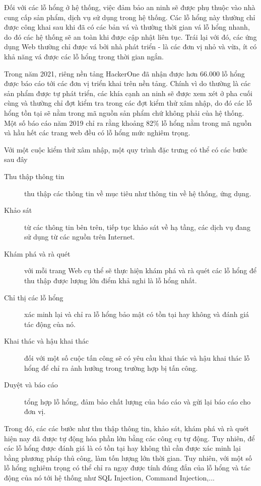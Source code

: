 \documentclass[./../main.tex]{subfiles}
\begin{document}
Đối với các lỗ hổng ở hệ thống, việc đảm bảo an ninh sẽ được phụ thuộc vào nhà cung cấp sản phẩm, dịch vụ sử dụng trong hệ thống.
Các lỗ hổng này thường chỉ được công khai sau khi đã có các bản vá và thường thời gian vá lỗ hổng nhanh, do đó các hệ thống sẽ an toàn khi được cập nhật liên tục. Trái lại với đó, các ứng dụng Web thường chỉ được vá bởi nhà phát triển - là các đơn vị nhỏ và vừa, ít có khả năng vá được các lỗ hổng trong thời gian ngắn.

Trong năm 2021, riêng nền tảng HackerOne đã nhận được hơn 66.000 lỗ hổng được báo cáo tới các đơn vị triển khai trên nền tảng.
Chính vì do thường là các sản phẩm được tự phát triển, các khía cạnh an ninh sẽ được xem xét ở pha cuối cùng và thường chỉ đợt kiểm tra trong các đợt kiểm thử xâm nhập, do đó các lỗ hổng tồn tại sẽ nằm trong mã nguồn sản phẩm chứ không phải của hệ thống. Một số báo cáo năm 2019 chỉ ra rằng khoảng 82\% lỗ hổng nằm trong mã nguồn và hầu hết các trang web đều có lỗ hổng mức nghiêm trọng.

Với một cuộc kiểm thử xâm nhập, một quy trình đặc trưng có thể có các bước sau đây
\begin{description}
	\item [Thu thập thông tin] thu thập các thông tin về mục tiêu như thông tin về hệ thống, ứng dụng.
	\item [Khảo sát] từ các thông tin bên trên, tiếp tục khảo sát về hạ tầng, các dịch vụ đang sử dụng từ các nguồn trên Internet.
	\item [Khám phá và rà quét] với mỗi trang Web cụ thể sẽ thực hiện khám phá và rà quét các lỗ hổng để thu thập được lượng lớn điểm khả nghi là lỗ hổng nhất.
	\item [Chỉ thị các lỗ hổng] xác minh lại và chỉ ra lỗ hổng bảo mật có tồn tại hay không và đánh giá tác động của nó.
	\item [Khai thác và hậu khai thác] đối với một số cuộc tấn công sẽ có yêu cầu khai thác và hậu khai thác lỗ hổng để chỉ ra ảnh hưởng trong trường hợp bị tấn công.
	\item [Duyệt và báo cáo] tổng hợp lỗ hổng, đảm bảo chất lượng của báo cáo và gửi lại báo cáo cho đơn vị.
\end{description}
Trong đó, các các bước như thu thập thông tin, khảo sát, khám phá và rà quét hiện nay đã được tự động hóa phần lớn bằng các công cụ tự động. Tuy nhiên, để các lỗ hổng được đánh giá là có tồn tại hay không thì cần được xác minh lại bằng phương pháp thủ công, làm tốn lượng lớn thời gian. Tuy nhiên, với một số lỗ hổng nghiêm trọng có thể chỉ ra ngay được tính đúng đắn của lỗ hổng và tác động của nó tới hệ thống như SQL Injection, Command Injection,...
\end{document}
